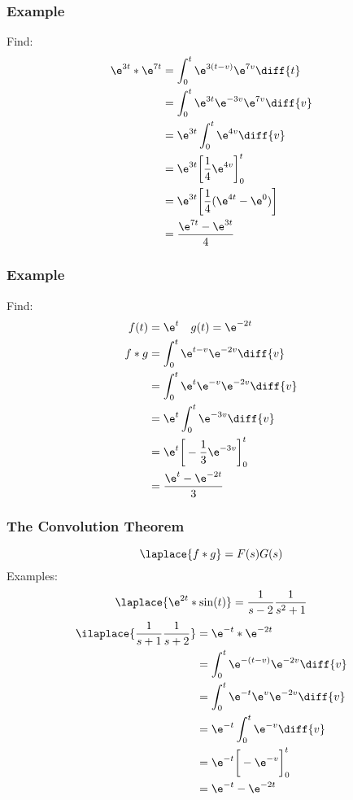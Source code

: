 \documentclass{math}
\begin{document}
\subsubsection*{Example}
Find:
\begin{align*}
  \e^{3t}*\e^{7t} &= \int_{0}^{t}\e^{3(t-v)}\e^{7v}\diff{t} \\
  &= \int_{0}^{t}\e^{3t}\e^{-3v}\e^{7v}\diff{v} \\
  &= \e^{3t}\int_{0}^{t}\e^{4v}\diff{v} \\
  &= \e^{3t}\bigg[\frac{1}{4}\e^{4v}\bigg]_{0}^{t} \\
  &= \e^{3t}\bigg[\frac{1}{4}(\e^{4t}-\e^0)\bigg] \\
  &= \frac{\e^{7t}-\e^{3t}}{4}
\end{align*}

\subsubsection*{Example}
Find:
\begin{align*}
  f(t) &= \e^t \quad g(t) = \e^{-2t} \\
  f*g &= \int_{0}^{t}\e^{t-v}\e^{-2v}\diff{v} \\
  &= \int_{0}^{t}\e^{t}\e^{-v}\e^{-2v}\diff{v} \\
  &= \e^{t}\int_{0}^{t}\e^{-3v}\diff{v} \\
  &= \e^{t}\bigg[-\frac{1}{3}\e^{-3v}\bigg]_{0}^{t} \\
  &= \frac{\e^t-\e^{-2t}}{3}
\end{align*}

\subsubsection*{The Convolution Theorem}
\[ \laplace{f*g} = F(s)G(s) \]
Examples:
\[ \laplace{\e^{2t}*\sin(t)} = \frac{1}{s-2}\frac{1}{s^2+1} \]
\begin{align*}
  \ilaplace{\frac{1}{s+1}\frac{1}{s+2}} &= \e^{-t}*\e^{-2t} \\
  &= \int_{0}^{t}\e^{-(t-v)}\e^{-2v}\diff{v} \\
  &= \int_{0}^{t}\e^{-t}\e^{v}\e^{-2v}\diff{v} \\
  &= \e^{-t}\int_{0}^{t}\e^{-v}\diff{v} \\
  &= \e^{-t}\bigg[-\e^{-v}\bigg]_{0}^{t} \\
  &= \e^{-t}-\e^{-2t}
\end{align*}
\end{document}
